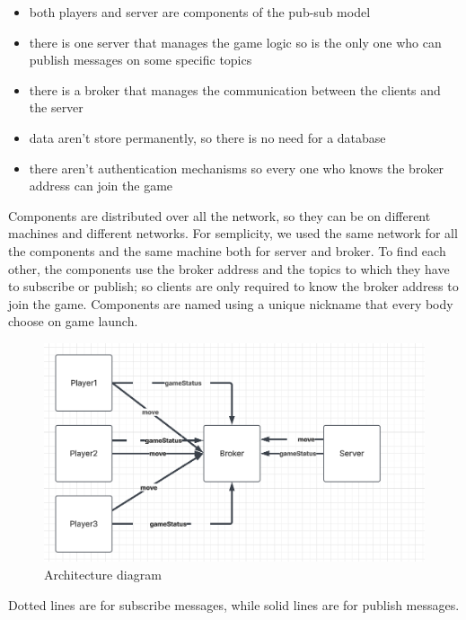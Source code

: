 \documentclass{scrartcl}
\begin{document}
  \begin{itemize}
    \item both players and server are components of the pub-sub model
    \item there is one server that manages the game logic so is the only one who can publish messages on some specific topics
    \item there is a broker that manages the communication between the clients and the server
    \item data aren't store permanently, so there is no need for a database 
    \item there aren't authentication mechanisms so every one who knows the broker address can join the game

  \end{itemize}
  Components are distributed over all the network, so they can be on different machines and different networks. For semplicity, we used the same network for all the components and the same machine both for server and broker. \newline
  To find each other, the components use the broker address and the topics to which they have to subscribe or publish; so clients are only required to know the broker address to join the game. \newline
  Components are named using a unique nickname that every body choose on game launch.


\begin{figure}[H]
  \caption{Architecture diagram}
  \centering
  \includegraphics[scale=0.5]{figures/pubsubdiagram.png}
  \end{figure}

  Dotted lines are for subscribe messages, while solid lines are for publish messages. \newline
\end{document}
